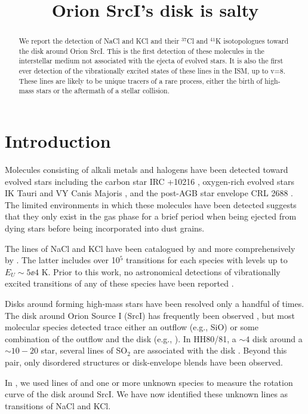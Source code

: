 \documentclass[twocolumn]{aastex62}
\newcommand{\sourcei}{SrcI\xspace}
\begin{document}


\title{Orion \sourcei's disk is salty}
\begin{abstract}
    We report the detection of NaCl and KCl and their $^{37}$Cl and $^{41}$K
    isotopologues toward the disk around Orion \sourcei.
    This is the first detection of these molecules in the interstellar
    medium not associated with the ejecta of evolved stars.  It is also
    the first ever detection of the vibrationally excited states of these
    lines in the ISM, up to v=8.
    These lines are likely to be unique tracers of a rare process, either
    the birth of high-mass stars or the aftermath of a stellar collision.
\end{abstract}

\section{Introduction}
Molecules consisting of alkali metals and halogens have been detected
toward evolved stars including the carbon star IRC +10216 \citep{Cernicharo1987a},
oxygen-rich evolved stars IK Tauri and VY Canis Majoris \citep{Milam2007a},
and the post-AGB star envelope CRL 2688 \citep{Highberger2003a}.
The limited environments in which these molecules have been detected
suggests that they only exist in the gas phase for a brief period
when being ejected from dying stars before being incorporated into
dust grains.

The lines of NaCl and KCl have been catalogued by \citet{Caris2004a} and more
comprehensively by \citet{Barton2014a}.  The latter includes over 10$^5$
transitions for each species with levels up to $E_U\sim5\ee{4}$ K.  Prior to
this work, no astronomical detections of vibrationally excited transitions of
any of these species have been reported \citep[e.g., see the review
by][]{McGuire2018a}.

Disks around forming high-mass stars have been resolved only a handful of
times.  The disk around Orion Source I (\sourcei) has frequently been observed
\citep{Hirota2014a,Plambeck2016a,Ginsburg2018a}, but most molecular species
detected trace either an outflow (e.g., SiO) or some combination of the outflow
and the disk (e.g., \water).  In HH80/81, a $\sim4$ \msun disk around a
$\sim10-20$ \msun star, several lines of SO$_2$ are associated with the disk
\citep{Girart2017a}.  Beyond this pair, only disordered structures or
disk-envelope blends have been observed.

In \citet[][the brine paper]{Ginsburg2018b}, we used lines of \water and one or
more unknown species to measure the rotation curve of the disk around \sourcei.
We have now identified these unknown lines as transitions of NaCl and KCl.
\end{document}
